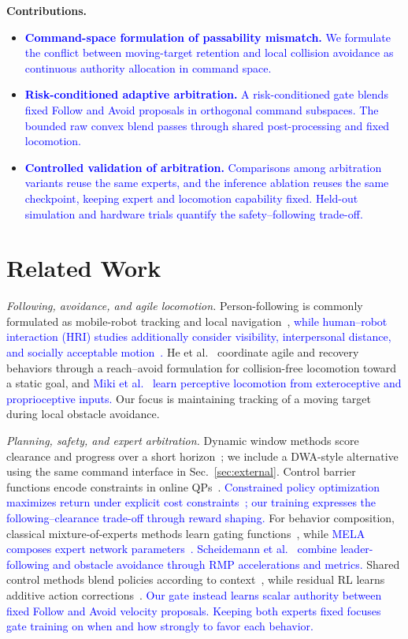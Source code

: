 \documentclass[letterpaper, 10 pt, conference]{ieeeconf}
\newcommand{\rev}[1]{\textcolor{blue}{#1}}
\begin{document}
\noindent\textbf{Contributions.}
\begin{itemize}
\item \rev{\textbf{Command-space formulation of passability mismatch.} We formulate the conflict between moving-target retention and local collision avoidance as continuous authority allocation in command space.}
\item \rev{\textbf{Risk-conditioned adaptive arbitration.} A risk-conditioned gate blends fixed Follow and Avoid proposals in orthogonal command subspaces. The bounded raw convex blend passes through shared post-processing and fixed locomotion.}
\item \rev{\textbf{Controlled validation of arbitration.} Comparisons among arbitration variants reuse the same experts, and the inference ablation reuses the same checkpoint, keeping expert and locomotion capability fixed. Held-out simulation and hardware trials quantify the safety--following trade-off.}
\end{itemize}

\section{Related Work}
\emph{Following, avoidance, and agile locomotion.}
Person-following is commonly formulated as mobile-robot tracking and local navigation~\cite{ref:personfollowing}, \rev{while human--robot interaction (HRI) studies additionally consider visibility, interpersonal distance, and socially acceptable motion~\cite{ref:socialfollow}.} He et al.~\cite{ref:abs} coordinate agile and recovery behaviors through a reach--avoid formulation for collision-free locomotion toward a static goal, and \rev{Miki et al.~\cite{ref:miki} learn perceptive locomotion from exteroceptive and proprioceptive inputs.} Our focus is maintaining tracking of a moving target during local obstacle avoidance.

\emph{Planning, safety, and expert arbitration.}
Dynamic window methods score clearance and progress over a short horizon~\cite{ref:dwa}; we include a DWA-style alternative using the same command interface in Sec.~\ref{sec:external}. Control barrier functions encode constraints in online QPs~\cite{ref:cbf}. \rev{Constrained policy optimization maximizes return under explicit cost constraints~\cite{ref:cpo}; our training expresses the following--clearance trade-off through reward shaping.} For behavior composition, classical mixture-of-experts methods learn gating functions~\cite{ref:moe}, while \rev{MELA composes expert network parameters~\cite{ref:mela}.} \rev{Scheidemann et al.~\cite{ref:leaderfollow} combine leader-following and obstacle avoidance through RMP accelerations and metrics.} Shared control methods blend policies according to context~\cite{ref:policyblend}, while residual RL learns additive action corrections~\cite{ref:residualrl}. \rev{Our gate instead learns scalar authority between fixed Follow and Avoid velocity proposals. Keeping both experts fixed focuses gate training on when and how strongly to favor each behavior.}
\end{document}
